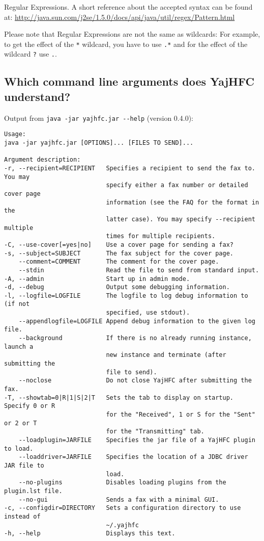 \documentclass[a4paper,10pt]{scrartcl}
\begin{document}
Regular Expressions. A short reference about the accepted syntax can be found at:
\url{http://java.sun.com/j2se/1.5.0/docs/api/java/util/regex/Pattern.html}

Please note that Regular Expressions are not the same as wildcards: 
For example, to get the effect of the \verb.*. wildcard, you have to use \verb#.*# and 
for the effect of the wildcard \verb#?# use \verb#.#.

\subsection{Which command line arguments does YajHFC understand?}

Output from \verb#java -jar yajhfc.jar --help# (version 0.4.0):
\begin{verbatim}
Usage:
java -jar yajhfc.jar [OPTIONS]... [FILES TO SEND]...

Argument description:
-r, --recipient=RECIPIENT   Specifies a recipient to send the fax to. You may
                            specify either a fax number or detailed cover page
                            information (see the FAQ for the format in the
                            latter case). You may specify --recipient multiple
                            times for multiple recipients.
-C, --use-cover[=yes|no]    Use a cover page for sending a fax?
-s, --subject=SUBJECT       The fax subject for the cover page.
    --comment=COMMENT       The comment for the cover page.
    --stdin                 Read the file to send from standard input.
-A, --admin                 Start up in admin mode.
-d, --debug                 Output some debugging information.
-l, --logfile=LOGFILE       The logfile to log debug information to (if not
                            specified, use stdout).
    --appendlogfile=LOGFILE Append debug information to the given log file.
    --background            If there is no already running instance, launch a
                            new instance and terminate (after submitting the
                            file to send).
    --noclose               Do not close YajHFC after submitting the fax.
-T, --showtab=0|R|1|S|2|T   Sets the tab to display on startup. Specify 0 or R
                            for the "Received", 1 or S for the "Sent" or 2 or T
                            for the "Transmitting" tab.
    --loadplugin=JARFILE    Specifies the jar file of a YajHFC plugin to load.
    --loaddriver=JARFILE    Specifies the location of a JDBC driver JAR file to
                            load.
    --no-plugins            Disables loading plugins from the plugin.lst file.
    --no-gui                Sends a fax with a minimal GUI.
-c, --configdir=DIRECTORY   Sets a configuration directory to use instead of
                            ~/.yajhfc
-h, --help                  Displays this text.
\end{verbatim}
\end{document}
